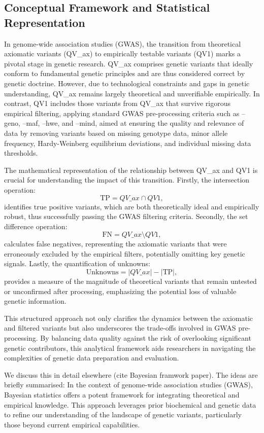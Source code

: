 \subsection*{Conceptual Framework and Statistical Representation}

In genome-wide association studies (GWAS), the transition from theoretical axiomatic variants (QV\_ax) to empirically testable variants (QV1) marks a pivotal stage in genetic research. QV\_ax comprises genetic variants that ideally conform to fundamental genetic principles and are thus considered correct by genetic doctrine. However, due to technological constraints and gaps in genetic understanding, QV\_ax remains largely theoretical and unverifiable empirically. In contrast, QV1 includes those variants from QV\_ax that survive rigorous empirical filtering, applying standard GWAS pre-processing criteria such as --geno, --maf, --hwe, and --mind, aimed at ensuring the quality and relevance of data by removing variants based on missing genotype data, minor allele frequency, Hardy-Weinberg equilibrium deviations, and individual missing data thresholds.

The mathematical representation of the relationship between QV\_ax and QV1 is crucial for understanding the impact of this transition. Firstly, the intersection operation:
\[
\text{TP} = QV\_ax \cap QV1,
\]
identifies true positive variants, which are both theoretically ideal and empirically robust, thus successfully passing the GWAS filtering criteria. Secondly, the set difference operation:
\[
\text{FN} = QV\_ax \setminus QV1,
\]
calculates false negatives, representing the axiomatic variants that were erroneously excluded by the empirical filters, potentially omitting key genetic signals. Lastly, the quantification of unknowns:
\[
\text{Unknowns} = |QV\_ax| - |\text{TP}|,
\]
provides a measure of the magnitude of theoretical variants that remain untested or unconfirmed after processing, emphasizing the potential loss of valuable genetic information.

This structured approach not only clarifies the dynamics between the axiomatic and filtered variants but also underscores the trade-offs involved in GWAS pre-processing. By balancing data quality against the risk of overlooking significant genetic contributors, this analytical framework aids researchers in navigating the complexities of genetic data preparation and evaluation.



 We discuss this in detail elsewhere (cite Bayesian framwork paper). 
 The ideas are briefly summarised:
In the context of genome-wide association studies (GWAS), Bayesian statistics offers a potent framework for integrating theoretical and empirical knowledge. This approach leverages prior biochemical and genetic data to refine our understanding of the landscape of genetic variants, particularly those beyond current empirical capabilities.

